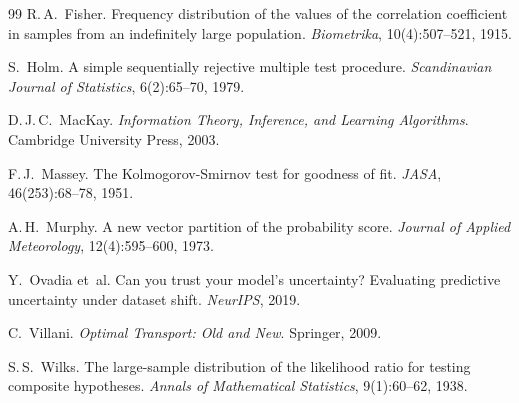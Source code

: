 \documentclass[11pt]{article}
\theoremstyle{definition}
\theoremstyle{remark}
\begin{document}
\begin{thebibliography}{99}
R.\,A.~Fisher. Frequency distribution of the values of the correlation
coefficient in samples from an indefinitely large population.
\emph{Biometrika}, 10(4):507--521, 1915.

S.~Holm. A simple sequentially rejective multiple test procedure.
\emph{Scandinavian Journal of Statistics}, 6(2):65--70, 1979.

D.\,J.\,C.~MacKay. \emph{Information Theory, Inference, and Learning
Algorithms}. Cambridge University Press, 2003.

F.\,J.~Massey. The Kolmogorov-Smirnov test for goodness of fit. \emph{JASA},
46(253):68--78, 1951.

A.\,H.~Murphy. A new vector partition of the probability score.
\emph{Journal of Applied Meteorology}, 12(4):595--600, 1973.

Y.~Ovadia et~al. Can you trust your model's uncertainty? Evaluating
predictive uncertainty under dataset shift. \emph{NeurIPS}, 2019.

C.~Villani. \emph{Optimal Transport: Old and New}. Springer, 2009.

S.\,S.~Wilks. The large-sample distribution of the likelihood ratio for
testing composite hypotheses. \emph{Annals of Mathematical Statistics},
9(1):60--62, 1938.

\end{thebibliography}
\end{document}
